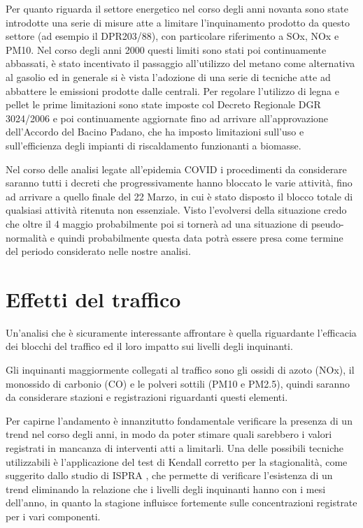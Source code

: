 \documentclass{article}
\begin{document}
Per quanto riguarda il settore energetico nel corso degli anni novanta sono state introdotte una serie di misure atte a limitare l'inquinamento prodotto da questo settore (ad esempio il DPR203/88), con particolare riferimento a SOx, NOx e PM10. Nel corso degli anni 2000 questi limiti sono stati poi continuamente abbassati, è stato incentivato il passaggio all'utilizzo del metano come alternativa al gasolio ed in generale si è vista l'adozione di una serie di tecniche atte ad abbattere le emissioni prodotte dalle centrali. 
Per regolare l'utilizzo di legna e pellet le prime limitazioni sono state imposte col Decreto Regionale DGR 3024/2006 e poi continuamente aggiornate fino ad arrivare all'approvazione dell'Accordo del Bacino Padano, che ha imposto limitazioni sull'uso e sull'efficienza degli impianti di riscaldamento funzionanti a biomasse.

Nel corso delle analisi legate all'epidemia COVID i procedimenti da considerare saranno tutti i decreti che progressivamente hanno bloccato le varie attività, fino ad arrivare a quello finale del 22 Marzo, in cui è stato disposto il blocco totale di qualsiasi attività ritenuta non essenziale. Visto l'evolversi della situazione credo che oltre il 4 maggio probabilmente poi si tornerà ad una situazione di pseudo-normalità e quindi probabilmente questa data potrà essere presa come termine del periodo considerato nelle nostre analisi.


\section{Effetti del traffico}
\label{sec:traffico}
Un'analisi che è sicuramente interessante affrontare è quella riguardante l'efficacia dei blocchi del traffico ed il loro impatto sui livelli degli inquinanti. 

Gli inquinanti maggiormente collegati al traffico sono gli ossidi di azoto (NOx), il monossido di carbonio (CO) e le polveri sottili (PM10 e PM2.5), quindi saranno da considerare stazioni e registrazioni riguardanti questi elementi.

Per capirne l'andamento è innanzitutto fondamentale verificare la presenza di un trend nel corso degli anni, in modo da poter stimare quali sarebbero i valori registrati in mancanza di interventi atti a limitarli. Una delle possibili tecniche utilizzabili è l'applicazione del test di Kendall corretto per la stagionalità, come suggerito dallo studio di ISPRA \cite{cattani2014analisi}, che permette di verificare l'esistenza di un trend eliminando la relazione che i livelli degli inquinanti hanno con i mesi dell'anno, in quanto la stagione influisce fortemente sulle concentrazioni registrate per i vari componenti.   
\end{document}
